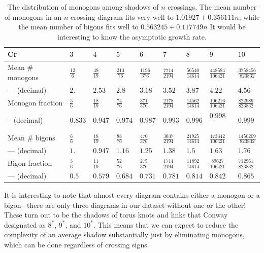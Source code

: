 \documentclass[amsmath,secnumarabic,floatfix,amssymb,nofootinbib,nobibnotes,letterpaper,11pt,tightenlines,showkeys]{revtex4}
\theoremstyle{definition}
\let\mgp=\marginpar \marginparwidth18mm \marginparsep1mm
\def\marginpar#1{\mgp{\raggedright\tiny #1}}
\let\lbl=\label
\def\label#1{\lbl{#1}\ifinner\else\marginpar{\ref{#1} #1}\ignorespaces\fi}
\begin{document}
\begin{table}
\begin{ruledtabular}
\renewcommand{\arraystretch}{1.2}
\begin{tabular}{lllllllll}
Cr                 & $3$ & $4$             & $5$            & $6$                        & $7$ & $8$ & $9$ & $10$ \\ \hline
Mean $\#$ monogons & $\frac{\num{12}}{\num{6}}$ & $\frac{\num{48}}{\num{19}}$ & $\frac{\num{213}}{\num{76}}$ & $\frac{\num{1196}}{\num{376}}$ & $\frac{\num{7714}}{\num{2194}}$ & $\frac{\num{56540}}{\num{14614}}$ & $\frac{\num{448584}}{\num{106421}}$ & $\frac{\num{3758456}}{\num{823832}}$\\
\hphantom{Mean} --- (decimal) & $2.$ & $2.53$ & $2.8$ & $3.18$ & $3.52$ & $3.87$ & $4.22$ & $4.56$ \\
Monogon fraction   & $\frac{\num{5}}{\num{6}}$ & $\frac{\num{18}}{\num{19}}$ & 
$\frac{\num{74}}{\num{76}}$ & $\frac{\num{371}}{\num{376}}$ & 
$\frac{\num{2178}}{\num{2194}}$ & 
$\frac{\num{14562}}{\num{14614}}$ & 
$\frac{\num{106216}}{\num{106421}}$ & 
$\frac{\num{822989}}{\num{823832}}$ \\ 
\hphantom{Mean} -- (decimal) & $0.833$ & $0.947$ & $0.974$ & $0.987$ & $0.993$ & $0.996$ & $0.998$ \
& $0.999$ \\ \hline
Mean $\#$ bigons & $\frac{\num{6}}{\num{6}}$ & $\frac{\num{18}}{\num{19}}$ & 
$\frac{\num{88}}{\num{76}}$ & $\frac{\num{470}}{\num{376}}$ & 
$\frac{\num{3037}}{\num{2194}}$ & $\frac{\num{21925}}{\num{14614}}$ & 
$\frac{\num{173342}}{\num{106421}}$ & $\frac{\num{1450209}}{\num{823832}}$ \\
\hphantom{Mean} --- (decimal) & $1.$ & $0.947$ & $1.16$ & $1.25$ & $1.38$ & $1.5$ & $1.63$ & $1.76$ \\
Bigon fraction & $\frac{\num{3}}{\num{6}}$ & $\frac{\num{11}}{\num{19}}$ & 
$\frac{\num{52}}{\num{76}}$ & $\frac{\num{275}}{\num{376}}$ & 
$\frac{\num{1714}}{\num{2194}}$ & $\frac{\num{11892}}{\num{14614}}$ & 
$\frac{\num{89627}}{\num{106421}}$ & $\frac{\num{712961}}{\num{823832}}$ \\
\hphantom{Mean} --- (decimal) & $0.5$ & $0.579$ & $0.684$ & $0.731$ & $0.781$ & $0.814$ & $0.842$ & $0.865$ \\
\end{tabular}
\end{ruledtabular}
\caption{The distribution of monogons among shadows of $n$ crossings. The mean number of monogons in an $n$-crossing diagram fits very well to $1.01927 + 0.356111 n$, while the mean number of bigons fits well to $0.563245 + 0.117749 n$ It would be interesting to know the asymptotic growth rate.}
\label{tab:monogons and bigons}
\end{table}
It is interesting to note that almost every diagram contains either a monogon or a bigon-- there are only three diagrams in our dataset without one or the other! These turn out to be the shadows of torus knots and links that Conway designated as $8^*$, $9^*$, and $10^*$. This means that we can expect to reduce the complexity of an average shadow substantially just by eliminating monogons, which can be done regardless of crossing signs.
\end{document}
